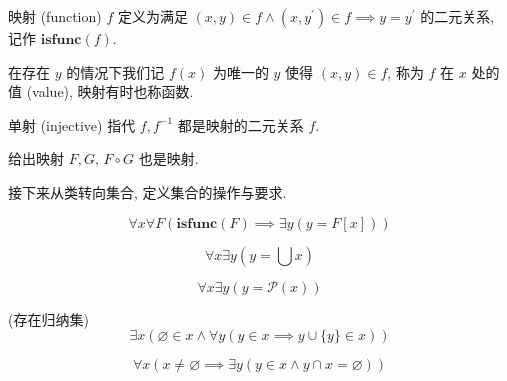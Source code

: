 \begin{definition}
    \label {definition:function (set)}
    映射 (function) \(f\) 定义为满足 \((x,y) \in f \land (x,y^\prime) \in f \implies y = y^\prime\) 的二元关系, 记作 \(\mathbf{isfunc} (f)\).

    在存在 \(y\) 的情况下我们记 \(f(x)\) 为唯一的 \(y\) 使得 \((x,y) \in f\), 称为 \(f\) 在 \(x\) 处的值 (value), 映射有时也称函数.
\end{definition}

\begin{definition}
    \label {definition:injective (set)}
    单射 (injective) 指代 \(f, f^{-1}\) 都是映射的二元关系 \(f\).
\end{definition}

\begin{corollary}
    给出映射 \(F, G\), \(F \circ G\) 也是映射.
\end{corollary}

接下来从类转向集合, 定义集合的操作与要求.

\begin{axiom}
    \label {axiom:NBG Axiom of Replacement}
    \[
        \forall x \forall F (\mathbf{isfunc} (F) \implies \exists y (y = F[x]))
    \]
\end{axiom}

\begin{axiom}
    \label {axiom:NBG Axiom of Union}
    \[
        \forall x \exists y (y = \bigcup x)
    \]
\end{axiom}

\begin{axiom}
    \label {axiom:NBG Axiom of Power Set}
    \[
        \forall x \exists y (y = \mathcal{P} (x))
    \]
\end{axiom}

\begin{axiom}
    \label {axiom:NBG Axiom of Infinity} (存在归纳集)
    \[
        \exists x (\varnothing \in x \land \forall y (y \in x \implies y \cup \{y\} \in x))
    \]
\end{axiom}

\begin{axiom}
    \label {axiom:NBG Axiom of Foundation}
    \[
        \forall x (x \neq \varnothing \implies \exists y (y \in x \land y \cap x = \varnothing))
    \]
\end{axiom}

